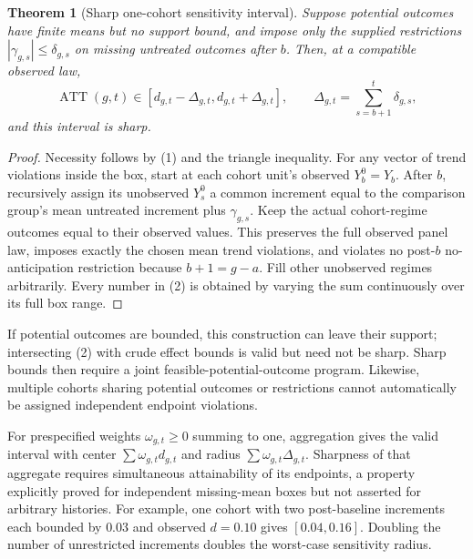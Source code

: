 \documentclass[11pt]{article}
\newtheorem{theorem}{Theorem}
\theoremstyle{definition}
\begin{document}
\begin{theorem}[Sharp one-cohort sensitivity interval]
Suppose potential outcomes have finite means but no support bound, and impose
only the supplied restrictions $|\gamma_{g,s}|\le\delta_{g,s}$ on missing
untreated outcomes after $b$. Then, at a compatible observed law,
\[
 \operatorname{ATT}(g,t)\in
 [d_{g,t}-\Delta_{g,t},d_{g,t}+\Delta_{g,t}],\qquad
 \Delta_{g,t}=\sum_{s=b+1}^t\delta_{g,s},                 \tag{2}
\]
and this interval is sharp.
\end{theorem}
\begin{proof}
Necessity follows by (1) and the triangle inequality. For any vector of trend
violations inside the box, start at each cohort unit's observed $Y_b^0=Y_b$.
After $b$, recursively assign its unobserved $Y_s^0$ a common increment equal
to the comparison group's mean untreated increment plus $\gamma_{g,s}$.
Keep the actual cohort-regime outcomes equal to their observed values.
This preserves the full observed panel law, imposes exactly the chosen mean
trend violations, and violates no post-$b$ no-anticipation restriction because
$b+1=g-a$. Fill other unobserved regimes arbitrarily. Every number in (2) is
obtained by varying the sum continuously over its full box range.
\end{proof}
If potential outcomes are bounded, this construction can leave their support;
intersecting (2) with crude effect bounds is valid but need not be sharp.
Sharp bounds then require a joint feasible-potential-outcome program. Likewise,
multiple cohorts sharing potential outcomes or restrictions cannot automatically
be assigned independent endpoint violations.

For prespecified weights $\omega_{g,t}\ge0$ summing to one, aggregation gives
the valid interval with center $\sum\omega_{g,t}d_{g,t}$ and radius
$\sum\omega_{g,t}\Delta_{g,t}$. Sharpness of that aggregate requires simultaneous
attainability of its endpoints, a property explicitly proved for independent
missing-mean boxes but not asserted for arbitrary histories. For example, one
cohort with two post-baseline increments each bounded by $0.03$ and observed
$d=0.10$ gives $[0.04,0.16]$. Doubling the number of unrestricted increments
doubles the worst-case sensitivity radius.
\end{document}
